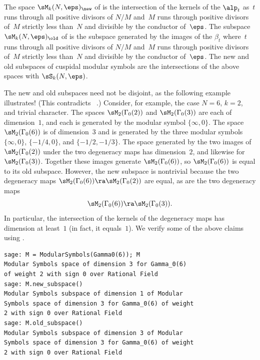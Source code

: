 \begin{definition}%
\label{def:newandoldsymbols}%
%
%
%
The space $\sM_k(N,\eps)_{\new}$ 
of  is the
intersection of the kernels of the $\alp_t$ as~$t$ 
runs through all positive divisors of $N/M$ and~$M$
runs through positive divisors of~$M$ strictly less than~$N$
and divisible by the conductor of~$\eps$.
The subspace $\sM_k(N,\eps)_{\old}$ 
of 
is the subspace generated by the images of the $\beta_t$
where~$t$ runs through all positive divisors of $N/M$ and~$M$
runs through positive divisors of~$M$ strictly less than~$N$
and divisible by the conductor of~$\eps$.
The new and old subspaces of cuspidal modular
symbols are the intersections of the above spaces
with $\sS_k(N,\eps)$.
\end{definition}

\begin{example}
  The new and old subspaces need not be disjoint, as the following
  example illustrates!  (This contradicts ~\cite[pg.~80]{merel:1585}.)
  Consider, for example, the case $N=6$, $k=2$, and trivial character.
  The spaces $\sM_2(\Gamma_0(2))$ and $\sM_2(\Gamma_0(3))$ are each of
  dimension~$1$, and each is generated by the modular symbol
  $\{\infty,0\}$.  The space $\sM_2(\Gamma_0(6))$ is of dimension~$3$
  and is generated by the three modular symbols $\{\infty, 0\}$,
  $\{-1/4, 0\}$, and $\{-1/2, -1/3\}$.  The space generated by the two
  images of $\sM_2(\Gamma_0(2))$ under the two degeneracy maps has
  dimension~$2$, and likewise for $\sM_2(\Gamma_0(3))$.  Together
  these images generate $\sM_2(\Gamma_0(6))$, so $\sM_2(\Gamma_0(6))$
  is equal to its old subspace.  However, the new subspace is
  nontrivial because the two degeneracy maps $\sM_2(\Gamma_0(6)) \ra
  \sM_2(\Gamma_0(2))$ are equal, as are the two degeneracy maps
  $$\sM_2(\Gamma_0(6)) \ra \sM_2(\Gamma_0(3)).$$  In particular, the
  intersection of the kernels of the degeneracy maps has dimension at
  least~$1$ (in fact, it equals~$1$).
We verify some of the above claims using \sage.
\begin{verbatim}
sage: M = ModularSymbols(Gamma0(6)); M
Modular Symbols space of dimension 3 for Gamma_0(6) 
of weight 2 with sign 0 over Rational Field
sage: M.new_subspace()
Modular Symbols subspace of dimension 1 of Modular 
Symbols space of dimension 3 for Gamma_0(6) of weight 
2 with sign 0 over Rational Field
sage: M.old_subspace()
Modular Symbols subspace of dimension 3 of Modular 
Symbols space of dimension 3 for Gamma_0(6) of weight 
2 with sign 0 over Rational Field
\end{verbatim}
\end{example}


